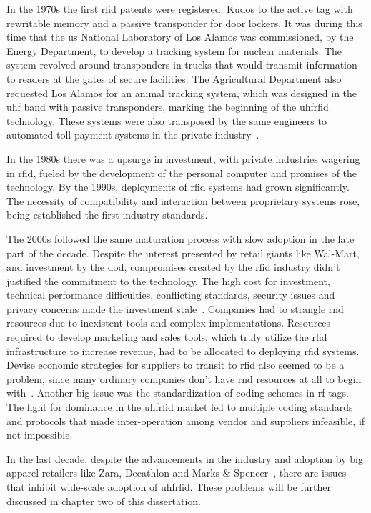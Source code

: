 In the 1970s the first \ac{rfid} patents were registered. Kudos to the active tag with rewritable memory and a passive transponder for door lockers. It was during this time that the \ac{us} National Laboratory of Los Alamos was commissioned, by the Energy Department, to develop a tracking system for nuclear materials. The system revolved around transponders in trucks that would transmit information to readers at the gates of secure facilities. The Agricultural Department also requested Los Alamos for an animal tracking system, which was designed in the \ac{uhf} band with passive transponders, marking the beginning of the \ac{uhfrfid} technology. These systems were also transposed by the same engineers to automated toll payment systems in the private industry~\cite{landtHistoryRFID2005, HistoryRFIDTechnology,casierAnalogCircuitDesign2011}.

In the 1980s there was a upsurge in investment, with private industries wagering in \ac{rfid}, fueled by the development of the personal computer and promises of the technology.
By the 1990s, deployments of \ac{rfid} systems had grown significantly. The necessity of compatibility and interaction between proprietary systems rose, being established the first industry standards. 

The 2000s followed the same maturation process with slow adoption in the late part of the decade. 
Despite the interest presented by retail giants like Wal-Mart, and investment by the \ac{dod}, compromises created by the \ac{rfid} industry didn't justified the commitment to the technology. The high cost for investment, technical performance difficulties, conflicting standards, security issues and privacy concerns made the investment stale~\cite{RFIDAdoptionStalls}. 
Companies had to strangle \ac{rnd} resources due to inexistent tools and complex implementations. Resources required to develop marketing and sales tools, which truly utilize the \ac{rfid} infrastructure to increase revenue, had to be allocated to deploying \ac{rfid} systems.
Devise economic strategies for suppliers to transit to \ac{rfid} also seemed to be a problem, since many ordinary companies don't have \ac{rnd} resources at all to begin with~\cite{gaudinSuppliersGainFailed2008}.
Another big issue was the standardization of coding schemes in \ac{rf} tags. The fight for dominance in the \ac{uhfrfid} market led to multiple coding standards and protocols that made inter-operation among vendor and suppliers infeasible, if not impossible.

In the last decade, despite the advancements in the industry and adoption by big apparel retailers like Zara, Decathlon and Marks \& Spencer~\cite{RFIDRetailApparel}, there are issues that inhibit wide-scale adoption of \ac{uhfrfid}. These problems will be further discussed in chapter two of this dissertation.

